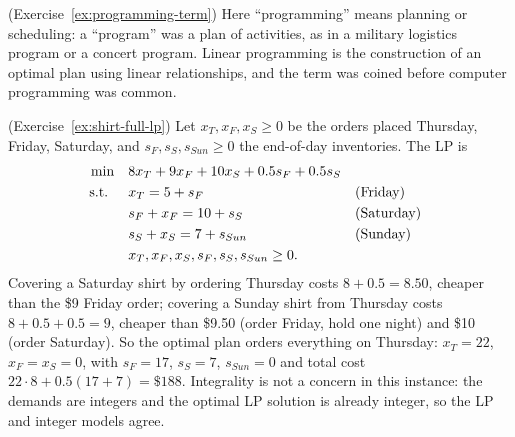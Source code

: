 \begin{solution}(Exercise~\ref{ex:programming-term})
Here ``programming'' means planning or scheduling: a ``program'' was a plan of activities, as in a military logistics program or a concert program.  Linear programming is the construction of an optimal plan using linear relationships, and the term was coined before computer programming was common.
\end{solution}

\begin{solution}(Exercise~\ref{ex:shirt-full-lp})
Let $x_T, x_F, x_S \geq 0$ be the orders placed Thursday, Friday, Saturday, and $s_F, s_S, s_{Sun} \geq 0$ the end-of-day inventories.  The LP is
\begin{align*}
\min \quad & 8x_T + 9x_F + 10x_S + 0.5s_F + 0.5s_S\\
\mbox{ s.t. } \quad & x_T = 5 + s_F && \mbox{(Friday)}\\
& s_F + x_F = 10 + s_S && \mbox{(Saturday)}\\
& s_S + x_S = 7 + s_{Sun} && \mbox{(Sunday)}\\
& x_T, x_F, x_S, s_F, s_S, s_{Sun} \geq 0.
\end{align*}
Covering a Saturday shirt by ordering Thursday costs $8 + 0.5 = 8.50$, cheaper than the \$9 Friday order; covering a Sunday shirt from Thursday costs $8 + 0.5 + 0.5 = 9$, cheaper than \$9.50 (order Friday, hold one night) and \$10 (order Saturday).  So the optimal plan orders everything on Thursday: $x_T = 22$, $x_F = x_S = 0$, with $s_F = 17$, $s_S = 7$, $s_{Sun} = 0$ and total cost $22 \cdot 8 + 0.5(17 + 7) = \$188$.  Integrality is not a concern in this instance: the demands are integers and the optimal LP solution is already integer, so the LP and integer models agree.
\end{solution}

%
%
%
